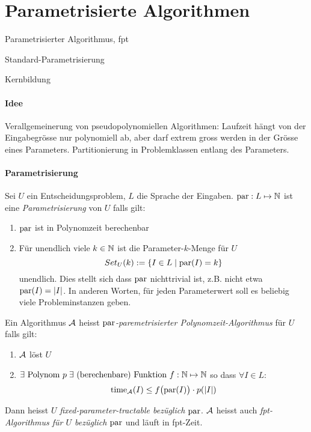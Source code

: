 \section{Parametrisierte Algorithmen}

\begin{takeaway}
    \item Parametrisierter Algorithmus, fpt
    \item Standard-Parametrisierung
    \item Kernbildung
\end{takeaway}

\paragraph{Idee}
Verallgemeinerung von pseudopolynomiellen Algorithmen:
Laufzeit hängt von der Eingabegrösse nur polynomiell ab, aber darf extrem gross werden in der Grösse eines Parameters.
Partitionierung in Problemklassen entlang des Parameters.

\paragraph{Parametrisierung}
Sei $U$ ein Entscheidungsproblem, $L$ die Sprache der Eingaben.
$\text{par}: L \mapsto \mathbb{N}$ ist eine \emph{Parametrisierung} von $U$ falls gilt:
\begin{enumerate}[label=(\roman*)]
    \item $\text{par}$ ist in Polynomzeit berechenbar
    \item Für unendlich viele $k \in \mathbb{N}$ ist die Parameter-$k$-Menge für $U$
    $$ Set_U(k) := \{ I \in L \; | \; \text{par}(I) = k \} $$ unendlich.
    Dies stellt sich dass $\text{par}$ nichttrivial ist, z.B. nicht etwa $\text{par}(I) = |I|$.
    In anderen Worten, für jeden Parameterwert soll es beliebig viele Probleminstanzen geben.
\end{enumerate}
Ein Algorithmus $\mathcal{A}$ heisst \emph{$\text{par}$-paremetrisierter Polynomzeit-Algorithmus} für $U$ falls gilt:
\begin{enumerate}[label=(\roman*)]
    \item $\mathcal{A}$ löst $U$
    \item $ \exists \text{ Polynom } p \; \exists \text{ (berechenbare) Funktion } f : \mathbb{N} \mapsto \mathbb{N}$
    so dass $\forall I \in L$:
    $$\text{time}_{\mathcal{A}}(I) \leq f \big( \text{par}(I) \big) \cdot p(|I|) $$
\end{enumerate}
Dann heisst $U$ \emph{fixed-parameter-tractable bezüglich $\text{par}$}.
$\mathcal{A}$ heisst auch \emph{fpt-Algorithmus für $U$ bezüglich $\text{par}$} und läuft in fpt-Zeit.

